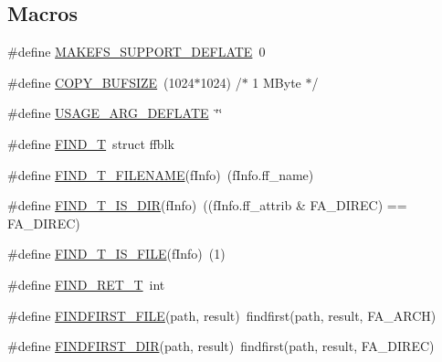 \subsection*{Macros}
\begin{DoxyCompactItemize}
\item 
\#define \hyperlink{openmote-cc2538_2lwip_2src_2apps_2httpd_2makefsdata_2makefsdata_8c_a9876b64c23e0e5cec59f0c72305b6695}{M\+A\+K\+E\+F\+S\+\_\+\+S\+U\+P\+P\+O\+R\+T\+\_\+\+D\+E\+F\+L\+A\+TE}~0
\item 
\#define \hyperlink{openmote-cc2538_2lwip_2src_2apps_2httpd_2makefsdata_2makefsdata_8c_a3aaec558a3f7b79425a150b659a30622}{C\+O\+P\+Y\+\_\+\+B\+U\+F\+S\+I\+ZE}~(1024$\ast$1024) /$\ast$ 1 M\+Byte $\ast$/
\item 
\#define \hyperlink{openmote-cc2538_2lwip_2src_2apps_2httpd_2makefsdata_2makefsdata_8c_a69b487446ca991fdde6e1dfe480f8740}{U\+S\+A\+G\+E\+\_\+\+A\+R\+G\+\_\+\+D\+E\+F\+L\+A\+TE}~\char`\"{}\char`\"{}
\item 
\#define \hyperlink{openmote-cc2538_2lwip_2src_2apps_2httpd_2makefsdata_2makefsdata_8c_ab479138d23d7b1f49a3601f1e0a8855a}{F\+I\+N\+D\+\_\+T}~struct ffblk
\item 
\#define \hyperlink{openmote-cc2538_2lwip_2src_2apps_2httpd_2makefsdata_2makefsdata_8c_a2104b9592c0bc44c4f3c8d101de12118}{F\+I\+N\+D\+\_\+\+T\+\_\+\+F\+I\+L\+E\+N\+A\+ME}(f\+Info)~(f\+Info.\+ff\+\_\+name)
\item 
\#define \hyperlink{openmote-cc2538_2lwip_2src_2apps_2httpd_2makefsdata_2makefsdata_8c_adbae1d756930a83772f39015a804c91a}{F\+I\+N\+D\+\_\+\+T\+\_\+\+I\+S\+\_\+\+D\+IR}(f\+Info)~((f\+Info.\+ff\+\_\+attrib \& F\+A\+\_\+\+D\+I\+R\+EC) == F\+A\+\_\+\+D\+I\+R\+EC)
\item 
\#define \hyperlink{openmote-cc2538_2lwip_2src_2apps_2httpd_2makefsdata_2makefsdata_8c_aea2a3fb6e791400f439995c8e0ddf914}{F\+I\+N\+D\+\_\+\+T\+\_\+\+I\+S\+\_\+\+F\+I\+LE}(f\+Info)~(1)
\item 
\#define \hyperlink{openmote-cc2538_2lwip_2src_2apps_2httpd_2makefsdata_2makefsdata_8c_a8b99087e0b37e6631f2ff14b4f3258b0}{F\+I\+N\+D\+\_\+\+R\+E\+T\+\_\+T}~int
\item 
\#define \hyperlink{openmote-cc2538_2lwip_2src_2apps_2httpd_2makefsdata_2makefsdata_8c_afc715543d140f05db178cb6380141dcd}{F\+I\+N\+D\+F\+I\+R\+S\+T\+\_\+\+F\+I\+LE}(path,  result)~findfirst(path, result, F\+A\+\_\+\+A\+R\+CH)
\item 
\#define \hyperlink{openmote-cc2538_2lwip_2src_2apps_2httpd_2makefsdata_2makefsdata_8c_af3854d5a7bcc0af080e904053c004914}{F\+I\+N\+D\+F\+I\+R\+S\+T\+\_\+\+D\+IR}(path,  result)~findfirst(path, result, F\+A\+\_\+\+D\+I\+R\+EC)

\end{DoxyCompactItemize}
